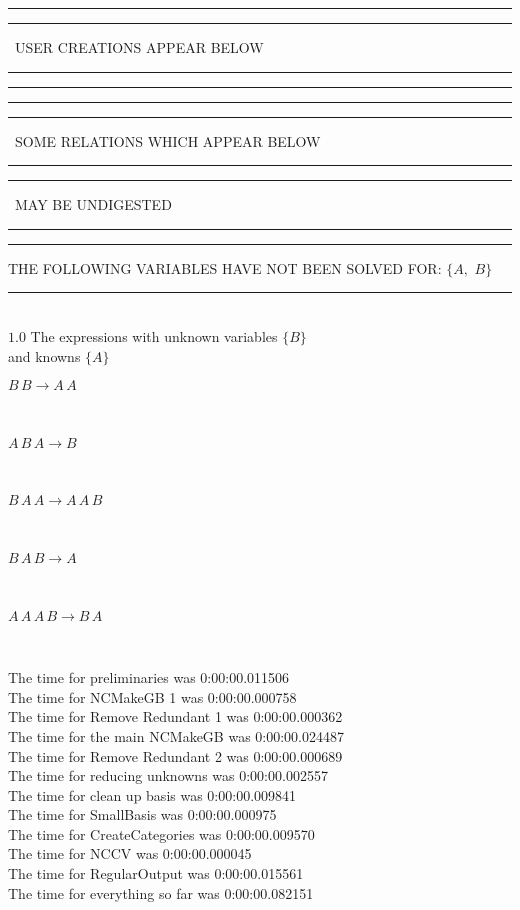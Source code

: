\documentclass[rep10,leqno]{report}
\begin{document}
\rule[2pt]{6in}{1pt}\hfil\break
\rule[2.5pt]{1.701in}{1pt}
\ USER CREATIONS APPEAR BELOW\ 
\rule[2.5pt]{1.701in}{1pt}\hfil\break
\rule[2pt]{6in}{1pt}\hfil\break
\rule[2pt]{6in}{4pt}\hfil\break
\rule[2pt]{1.45in}{4pt}
\ SOME RELATIONS WHICH APPEAR BELOW\ 
\rule[2pt]{1.45in}{4pt}\hfil\break
\rule[2pt]{2.18in}{4pt}
\ MAY BE UNDIGESTED\ 
\rule[2pt]{2.18in}{4pt}\hfil\break
\rule[2pt]{6in}{4pt}\hfil\break
THE FOLLOWING VARIABLES HAVE NOT BEEN SOLVED FOR:\hfil\break
$\{A,
$ $
B\}$
\smallskip\\
\rule[3pt]{6in}{.7pt}\\
$1.0$  The expressions with unknown variables $\{B\}$\\
and knowns $\{A\}$\smallskip\\
\begin{minipage}{6in}
$
B\,
 B\rightarrow A\,
 A
$
\end{minipage}\medskip \\
\begin{minipage}{6in}
$
A\,
 B\,
 A\rightarrow B
$
\end{minipage}\medskip \\
\begin{minipage}{6in}
$
B\,
 A\,
 A\rightarrow A\,
 A\,
 B
$
\end{minipage}\medskip \\
\begin{minipage}{6in}
$
B\,
 A\,
 B\rightarrow A
$
\end{minipage}\medskip \\
\begin{minipage}{6in}
$
A\,
 A\,
 A\,
 B\rightarrow B\,
 A
$
\end{minipage}\\
\vspace{10pt}

\noindent
The time for preliminaries was 0:00:00.011506\\
The time for NCMakeGB 1 was 0:00:00.000758\\
The time for Remove Redundant 1 was 0:00:00.000362\\
The time for the main NCMakeGB was 0:00:00.024487\\
The time for Remove Redundant 2 was 0:00:00.000689\\
The time for reducing unknowns was 0:00:00.002557\\
The time for clean up basis was 0:00:00.009841\\
The time for SmallBasis was 0:00:00.000975\\
The time for CreateCategories was 0:00:00.009570\\
The time for NCCV was 0:00:00.000045\\
The time for RegularOutput was 0:00:00.015561\\
The time for everything so far was 0:00:00.082151\\
\end{document}
